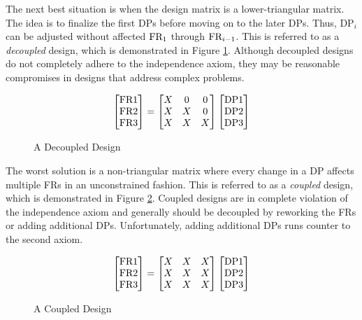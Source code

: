 The next best situation is when the design matrix is a lower-triangular matrix.  The idea is to finalize the first
DPs before moving on to the later DPs.  Thus, \(\text{DP}_i\) can be adjusted without affected \(\text{FR}_1\) through
\(\text{FR}_{i-1}\).  This is referred to as a \emph{decoupled} design, which is demonstrated in Figure
\ref{fig:decoupled}.  Although decoupled designs do not completely adhere to the independence axiom, they may be
reasonable compromises in designs that address complex problems.

\begin{figure}[h]
  \label{fig:decoupled}
  \begin{equation*}
    \begin{bmatrix}
      \text{FR}1 \\ \text{FR}2 \\ \text{FR}3
    \end{bmatrix}=\begin{bmatrix}
    X & 0 & 0 \\
    X & X & 0 \\
    X & X & X \\
    \end{bmatrix}\begin{bmatrix}
      \text{DP}1 \\ \text{DP}2 \\ \text{DP}3
    \end{bmatrix}
  \end{equation*}
  \caption{A Decoupled Design}
\end{figure}

The worst solution is a non-triangular matrix where every change in a DP affects multiple FRs in an unconstrained
fashion.  This is referred to as a \emph{coupled} design, which is demonstrated in Figure \ref{fig:coupled}.
Coupled designs are in complete violation of the independence axiom and generally should be decoupled by reworking
the FRs or adding additional DPs.  Unfortunately, adding additional DPs runs counter to the second axiom.

\begin{figure}[h]
  \label{fig:coupled}
  \begin{equation*}
    \begin{bmatrix}
      \text{FR}1 \\ \text{FR}2 \\ \text{FR}3
    \end{bmatrix}=\begin{bmatrix}
    X & X & X \\
    X & X & X \\
    X & X & X \\
    \end{bmatrix}\begin{bmatrix}
      \text{DP}1 \\ \text{DP}2 \\ \text{DP}3
    \end{bmatrix}
  \end{equation*}
  \caption{A Coupled Design}
\end{figure}

